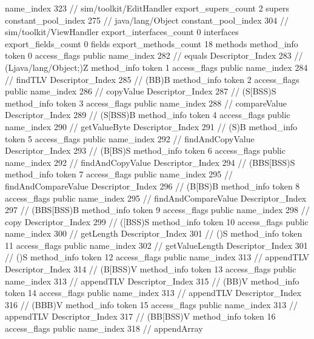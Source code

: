{{{			name_index	323		// sim/toolkit/EditHandler
			export_supers_count	2
			supers {
				constant_pool_index	275		// java/lang/Object
				constant_pool_index	304		// sim/toolkit/ViewHandler
			}
			export_interfaces_count	0
			interfaces {
			}
			export_fields_count	0
			fields {
			}
			export_methods_count	18
			methods {
				method_info {
					token	0
					access_flags	public
					name_index	282		// equals
					Descriptor_Index	283		// (Ljava/lang/Object;)Z
				}
				method_info {
					token	1
					access_flags	public
					name_index	284		// findTLV
					Descriptor_Index	285		// (BB)B
				}
				method_info {
					token	2
					access_flags	public
					name_index	286		// copyValue
					Descriptor_Index	287		// (S[BSS)S
				}
				method_info {
					token	3
					access_flags	public
					name_index	288		// compareValue
					Descriptor_Index	289		// (S[BSS)B
				}
				method_info {
					token	4
					access_flags	public
					name_index	290		// getValueByte
					Descriptor_Index	291		// (S)B
				}
				method_info {
					token	5
					access_flags	public
					name_index	292		// findAndCopyValue
					Descriptor_Index	293		// (B[BS)S
				}
				method_info {
					token	6
					access_flags	public
					name_index	292		// findAndCopyValue
					Descriptor_Index	294		// (BBS[BSS)S
				}
				method_info {
					token	7
					access_flags	public
					name_index	295		// findAndCompareValue
					Descriptor_Index	296		// (B[BS)B
				}
				method_info {
					token	8
					access_flags	public
					name_index	295		// findAndCompareValue
					Descriptor_Index	297		// (BBS[BSS)B
				}
				method_info {
					token	9
					access_flags	public
					name_index	298		// copy
					Descriptor_Index	299		// ([BSS)S
				}
				method_info {
					token	10
					access_flags	public
					name_index	300		// getLength
					Descriptor_Index	301		// ()S
				}
				method_info {
					token	11
					access_flags	public
					name_index	302		// getValueLength
					Descriptor_Index	301		// ()S
				}
				method_info {
					token	12
					access_flags	public
					name_index	313		// appendTLV
					Descriptor_Index	314		// (B[BSS)V
				}
				method_info {
					token	13
					access_flags	public
					name_index	313		// appendTLV
					Descriptor_Index	315		// (BB)V
				}
				method_info {
					token	14
					access_flags	public
					name_index	313		// appendTLV
					Descriptor_Index	316		// (BBB)V
				}
				method_info {
					token	15
					access_flags	public
					name_index	313		// appendTLV
					Descriptor_Index	317		// (BB[BSS)V
				}
				method_info {
					token	16
					access_flags	public
					name_index	318		// appendArray
}}}}}
